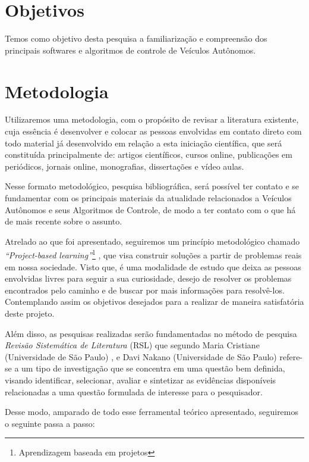 \documentclass{article}
\begin{document}
\section{Objetivos} \label{objetivo}
Temos como objetivo desta pesquisa a familiarização e compreensão dos principais softwares e algoritmos de controle de Veículos Autônomos.



\section{Metodologia} \label{Metodologia}
Utilizaremos uma metodologia, com o propósito de revisar a literatura existente, cuja essência é desenvolver e colocar as pessoas envolvidas em contato direto com todo material já desenvolvido em relação a esta iniciação científica, que será constituída principalmente de: artigos científicos, cursos online, publicações em periódicos, jornais online, monografias, dissertações e vídeo aulas.

Nesse formato metodológico, pesquisa bibliográfica, será possível ter contato e se fundamentar com os principais materiais da atualidade relacionados a Veículos Autônomos e seus Algoritmos de Controle, de modo a ter contato com o que há de mais recente sobre o assunto.


Atrelado ao que foi apresentado, seguiremos um princípio metodológico chamado \textit{“Project-based learning”}\footnote{Aprendizagem baseada em projetos} \cite{krajcik2006project}, que visa construir soluções a partir de problemas reais em nossa sociedade. Visto que, é uma modalidade de estudo que deixa as pessoas envolvidas livres para seguir a sua curiosidade, desejo de resolver os problemas encontrados pelo caminho e de buscar por mais informações para resolvê-los. Contemplando assim os objetivos desejados para a realizar de maneira satisfatória deste projeto. 

Além disso, as pesquisas realizadas serão fundamentadas no método de pesquisa \textit{Revisão Sistemática de Literatura} (RSL) que segundo Maria Cristiane (Universidade de São Paulo) \cite{revi3}, e Davi Nakano (Universidade de São Paulo) \cite{revi2} refere-se a um tipo de investigação que se concentra em uma questão bem definida, visando identificar, selecionar, avaliar e sintetizar as evidências disponíveis relacionadas a uma questão formulada de interesse para o pesquisador.

Desse modo, amparado de todo esse ferramental teórico apresentado, seguiremos o seguinte passa a passo:
\end{document}

